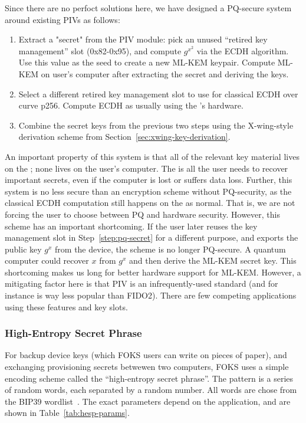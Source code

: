Since there are no perfoct solutions here, we have designed a PQ-secure system
around existing PIVs as follows:

\begin{enumerate}
  \item Extract a "secret" from the PIV module: pick an unused ``retired key management'' slot
  (0x82-0x95), and compute $g^{x^2}$ via the ECDH algorithm. Use this value as the seed
  to create a new ML-KEM keypair. Compute ML-KEM on user's computer after extracting the secret
  and deriving the keys.
  \label{step:pq-secret}

  \item Select a different retired key management slot to use for classical ECDH over curve p256.
  Compute ECDH as usually using the \yubi's hardware.

  \item  Combine the secret keys from the previous two steps using the X-wing-style
  derivation scheme from Section~\ref{sec:xwing-key-derivation}.
\end{enumerate}

An important property of this system is that all of the relevant key material
lives on the \yubi ; none lives on the user's computer. The \yubi is all the
user needs to recover important secrets, even if the computer is lost or suffers
data loss. Further, this system is no less secure than an encryption scheme
without PQ-security, as the classical ECDH computation still happens on the
\yubi{} as normal. That is, we are not forcing the user to choose between PQ and
hardware security.  However, this scheme has an important shortcoming. If the
user later reuses the key management slot in Step~\ref{step:pq-secret} for a
different purpose, and exports the public key $g^x$ from the device, the scheme
is no longer PQ-secure.  A quantum computer could recover $x$ from $g^x$ and
then derive the ML-KEM secret key.  This shortcoming makes us long for better
hardware support for ML-KEM.  However, a mitigating factor here is that PIV is
an infrequently-used standard (and for instance is way less popular than FIDO2).
There are few competing applications using these features and key slots.

\subsubsection{High-Entropy Secret Phrase}
\label{sec:hesp}

For backup device keys (which FOKS users can write on pieces of paper), and 
exchanging provisioning secrets betwewen two computers, FOKS uses a simple
encoding scheme called the ``high-entropy secret phrase''. The pattern is 
a series of random words, each separated by a random number. All
words are chose from the BIP39 wordlist~\cite{bip39}. The exact
parameters depend on the application, and are shown in Table~\ref{tab:hesp-params}.

